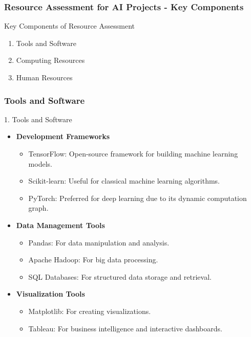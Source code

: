 \documentclass[aspectratio=169]{beamer}
\begin{document}
\begin{frame}[fragile]
    \frametitle{Resource Assessment for AI Projects - Key Components}
    \begin{block}{Key Components of Resource Assessment}
        \begin{enumerate}
            \item Tools and Software
            \item Computing Resources
            \item Human Resources
        \end{enumerate}
    \end{block}
\end{frame}

\begin{frame}[fragile]
    \frametitle{Tools and Software}
    \begin{block}{1. Tools and Software}
        \begin{itemize}
            \item \textbf{Development Frameworks}
                \begin{itemize}
                    \item TensorFlow: Open-source framework for building machine learning models.
                    \item Scikit-learn: Useful for classical machine learning algorithms.
                    \item PyTorch: Preferred for deep learning due to its dynamic computation graph.
                \end{itemize}
            \item \textbf{Data Management Tools}
                \begin{itemize}
                    \item Pandas: For data manipulation and analysis.
                    \item Apache Hadoop: For big data processing.
                    \item SQL Databases: For structured data storage and retrieval.
                \end{itemize}
            \item \textbf{Visualization Tools}
                \begin{itemize}
                    \item Matplotlib: For creating visualizations.
                    \item Tableau: For business intelligence and interactive dashboards.
                \end{itemize}
        \end{itemize}
    \end{block}
\end{frame}
\end{document}
